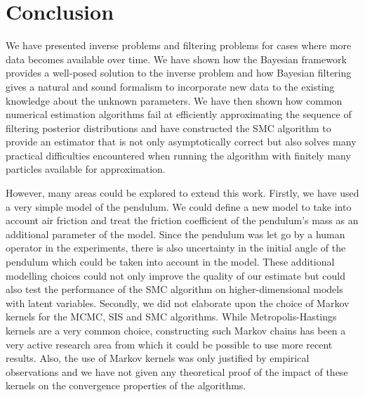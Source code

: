 \section{Conclusion}

We have presented inverse problems and filtering problems for cases where more data becomes available over time. We have shown how the Bayesian framework provides a well-posed solution to the inverse problem and how Bayesian filtering gives a natural and sound formalism to incorporate new data to the existing knowledge about the unknown parameters. We have then shown how common numerical estimation algorithms fail at efficiently approximating the sequence of filtering posterior distributions and have constructed the SMC algorithm to provide an estimator that is not only asymptotically correct but also solves many practical difficulties encountered when running the algorithm with finitely many particles available for approximation.

However, many areas could be explored to extend this work. Firstly, we have used a very simple model of the pendulum. We could define a new model to take into account air friction and treat the friction coefficient of the pendulum's mass as an additional parameter of the model. Since the pendulum was let go by a human operator in the experiments, there is also uncertainty in the initial angle of the pendulum which could be taken into account in the model. These additional modelling choices could not only improve the quality of our estimate but could also test the performance of the SMC algorithm on higher-dimensional models with latent variables. Secondly, we did not elaborate upon the choice of Markov kernels for the MCMC, SIS and SMC algorithms. While Metropolis-Hastings kernels are a very common choice, constructing such Markov chains has been a very active research area from which it could be possible to use more recent results. Also, the use of Markov kernels was only justified by empirical observations and we have not given any theoretical proof of the impact of these kernels on the convergence properties of the algorithms.

